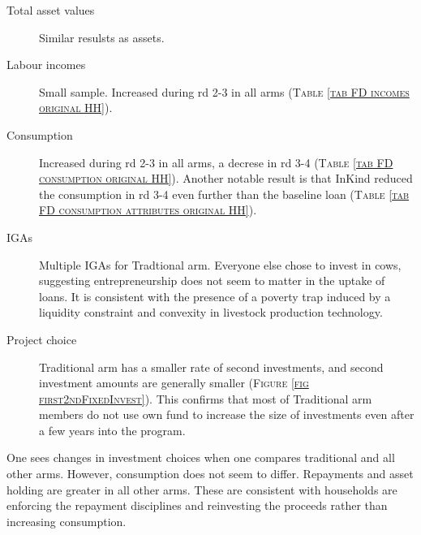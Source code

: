 \begin{description}
\item[Total asset values]	Similar resulsts as assets.
\item[Labour incomes]	Small sample. Increased during rd 2-3 in all arms (\textsc{\normalsize Table \ref{tab FD incomes original HH}}). 
\item[Consumption]	Increased during rd 2-3 in all arms, a decrese in rd 3-4 (\textsc{\normalsize Table \ref{tab FD consumption original HH}}). Another notable result is that \textsf{InKind} reduced the consumption in rd 3-4 even further than the baseline loan (\textsc{\normalsize Table \ref{tab FD consumption attributes original HH}}).
\item[IGAs]	Multiple IGAs for \textsf{Tradtional} arm. Everyone else chose to invest in cows, suggesting entrepreneurship does not seem to matter in the uptake of loans. It is consistent with the presence of a poverty trap induced by a liquidity constraint and convexity in livestock production technology.
\item[Project choice]	\textsf{Traditional} arm has a smaller rate of second investments, and second investment amounts are generally smaller (\textsc{\footnotesize Figure \ref{fig first2ndFixedInvest}}). This confirms that most of \textsf{Traditional} arm members do not use own fund to increase the size of investments even after a few years into the program.
\end{description}

One sees changes in investment choices when one compares \textsf{traditional} and all other arms. However, consumption does not seem to differ. Repayments and asset holding are greater in all other arms. These are consistent with households are enforcing the repayment disciplines and reinvesting the proceeds rather than increasing consumption. 






